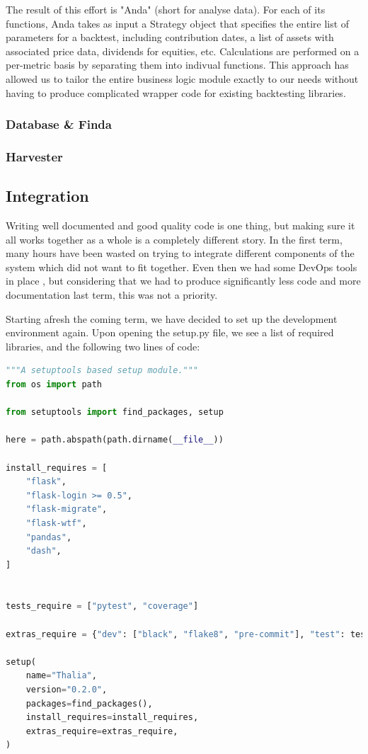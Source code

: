 \documentclass[main.tex]{subfiles}
\begin{document}
The result of this effort is "Anda" (short for analyse data). For each of its functions, Anda takes as input a Strategy object that specifies the entire list of parameters for a backtest, including contribution dates, a list of assets with associated price data, dividends for equities, etc. Calculations are performed on a per-metric basis by separating them into indivual functions.
This approach has allowed us to tailor the entire business logic module exactly to our needs without having to produce complicated wrapper code for existing backtesting libraries.

\subsubsection{Database \& Finda}
\label{Finda}
\subsubsection{Harvester}
\label{Harvester}

\subsection{Integration}
\label{Coding Standards}
 
 Writing well documented and good quality code is one thing, but making sure it all works together as a whole is a completely different story. In the first term, many hours have been wasted on trying to integrate different components of the system which did not want to fit together. Even then we had some DevOps tools in place \cite{DevOps}, but considering that we had to produce significantly less code and more documentation last term, this was not a priority. 
 
 Starting afresh the coming term, we have decided to set up the development environment again. Upon opening the setup.py file, we see a list of required libraries, and the following two lines of code:

\begin{lstlisting}[language=Python, caption=setup.py - Development environment, label=lst:Development_env]
"""A setuptools based setup module."""
from os import path

from setuptools import find_packages, setup

here = path.abspath(path.dirname(__file__))

install_requires = [
    "flask",
    "flask-login >= 0.5",
    "flask-migrate",
    "flask-wtf",
    "pandas",
    "dash",
]


tests_require = ["pytest", "coverage"]

extras_require = {"dev": ["black", "flake8", "pre-commit"], "test": tests_require}

setup(
    name="Thalia",
    version="0.2.0",
    packages=find_packages(),
    install_requires=install_requires,
    extras_require=extras_require,
)
\end{lstlisting}
\end{document}
